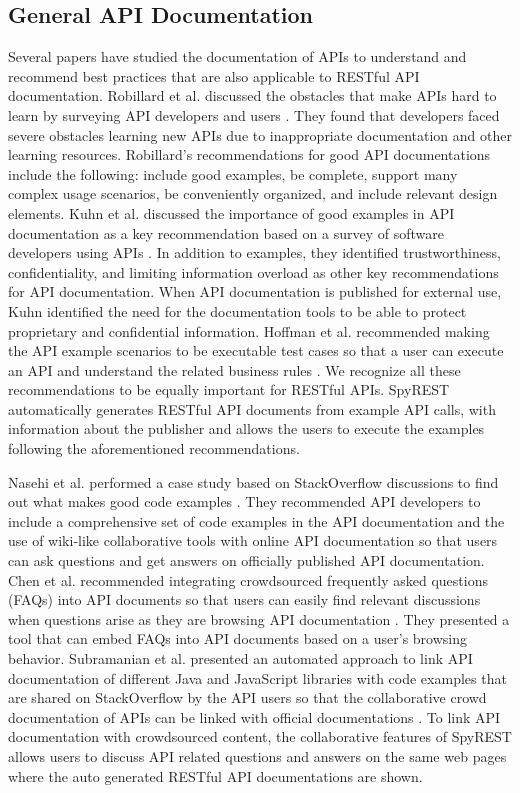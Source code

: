 \documentclass[conference]{IEEEtran}
\begin{document}
\subsection{General API Documentation} %
\label{ssub:api_learnability}
Several papers have studied the documentation of APIs to understand and recommend best practices that are also applicable to RESTful API documentation. Robillard et al. discussed the obstacles that make APIs hard to learn by surveying API developers and users \cite{Robillard_what_makes} \cite{Robillard_a_field_study}. They found that  developers faced severe obstacles learning new APIs due to inappropriate documentation and other learning resources. Robillard's recommendations for good API documentations include the following: include good examples, be complete, support many complex usage scenarios, be conveniently organized, and include relevant design elements. Kuhn et al. discussed the importance of good examples in API documentation as a key recommendation based on a survey of software developers using APIs \cite{Kuhn_on_designing}. In addition to examples, they identified trustworthiness, confidentiality, and limiting information overload as other key recommendations for API documentation. When API documentation is published for external use, Kuhn identified the need for the documentation tools to be able to protect proprietary and confidential information. Hoffman et al. recommended making the API example scenarios to be executable test cases so that a user can execute an API and understand the related business rules \cite{Hoffman_api_documentation}. We recognize all these recommendations to be equally important for RESTful APIs. SpyREST automatically generates RESTful API documents from example API calls, with information about the publisher and allows the users to execute the examples following the aforementioned recommendations.

Nasehi et al. performed a case study based on StackOverflow discussions to find out what makes good code examples \cite{Nasehi_what_makes}. They recommended API developers to include a comprehensive set of code examples in the API documentation and the use of wiki-like collaborative tools with online API documentation so that users can ask questions and get answers on officially published API documentation. Chen et al. recommended integrating crowdsourced frequently asked questions (FAQs) into API documents so that users can easily find relevant discussions when questions arise as they are browsing API documentation \cite{Chen_who_asked}. They presented a tool that can embed FAQs into API documents based on a user's browsing behavior. Subramanian et al. presented an automated approach to link API documentation of different Java and JavaScript libraries with code examples that are shared on StackOverflow by the API users so that the collaborative crowd documentation of APIs can be linked with official documentations \cite{Subramanian_live}. To link API documentation with crowdsourced content, the collaborative features of SpyREST allows users to discuss API related questions and answers on the same web pages where the auto generated RESTful API documentations are shown.
\end{document}
